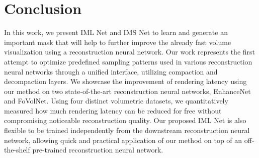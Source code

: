 \section{Conclusion}
In this work, we present IML Net and IMS Net to learn and generate an important mask that will help to further improve the already fast volume visualization using a reconstruction neural network. Our work represents the first attempt to optimize predefined sampling patterns used in various reconstruction neural networks through a unified interface, utilizing compaction and decompaction layers. We showcase the improvement of rendering latency using our method on two state-of-the-art reconstruction neural networks, EnhanceNet and FoVolNet. Using four distinct volumetric datasets, we quantitatively measured how much rendering latency can be reduced for free without compromising noticeable reconstruction quality. Our proposed IML Net is also flexible to be trained independently from the downstream reconstruction neural network, allowing quick and practical application of our method on top of an off-the-shelf pre-trained reconstruction neural network. 
